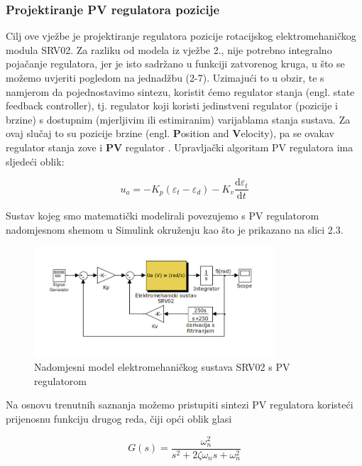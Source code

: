 \documentclass[12pt,a4paper]{article}
\begin{document}
\subsubsection{Projektiranje PV regulatora pozicije}

Cilj ove vježbe je projektiranje regulatora pozicije rotacijskog elektromehaničkog modula SRV02. Za razliku od modela iz vježbe 2., nije potrebno integralno pojačanje regulatora, jer je isto sadržano u funkciji zatvorenog kruga, u što se možemo uvjeriti pogledom na jednadžbu (2-7). Uzimajući to u obzir, te s namjerom da pojednostavimo sintezu, koristit ćemo regulator stanja (engl. state feedback controller), tj. regulator koji koristi jedinstveni regulator (pozicije i brzine) s dostupnim (mjerljivim ili estimiranim) varijablama stanja sustava. Za ovaj slučaj to su pozicije brzine (engl. \textbf{P}osition and \textbf{V}elocity), pa se ovakav regulator stanja zove i \textbf{PV} regulator . Upravljački algoritam PV regulatora ima sljedeći oblik:

\begin{equation}
u_a = - K_p(\varepsilon_t - \varepsilon_d) - K_v\frac{\mathrm{d}\varepsilon_t}{\mathrm{d}t}
\end{equation}

\newpage


Sustav kojeg smo matematički modelirali povezujemo s PV regulatorom nadomjesnom shemom u Simulink okruženju kao što je prikazano na slici 2.3.

\begin{figure}[h]
	\begin{center}
	\includegraphics[width=0.8\textwidth] {PV_model.png}
    \caption{Nadomjesni model elektromehaničkog sustava SRV02 s PV regulatorom}
    \end{center}
\end{figure}

Na osnovu trenutnih saznanja možemo pristupiti sintezi PV regulatora koristeći prijenosnu funkciju drugog reda, čiji opći oblik glasi

\begin{equation}
G(s) = \frac{\omega_n^2}{s^2+2\zeta\omega_ns+\omega_n^2}
\end{equation}
\end{document}

